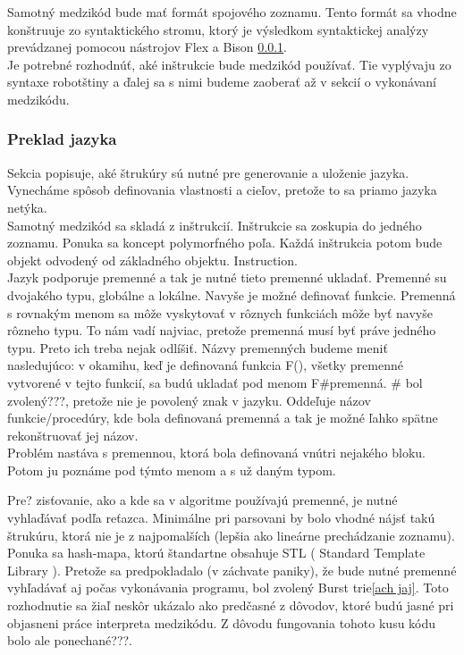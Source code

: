 
Samotný medzikód bude mať formát spojového zoznamu. Tento formát sa vhodne konštruuje zo syntaktického stromu, ktorý je výsledkom syntaktickej analýzy prevádzanej pomocou nástrojov Flex a Bison \ref{}.\\

Je potrebné rozhodnúť, aké inštrukcie bude medzikód používať. Tie vyplývaju zo syntaxe robotštiny a ďalej sa s nimi budeme zaoberať až v sekcií o vykonávaní medzikódu.

\subsubsection{Preklad jazyka}
Sekcia popisuje, aké štrukúry sú nutné pre generovanie a uloženie jazyka. Vynecháme spôsob definovania vlastnosti a cieľov, pretože to sa priamo jazyka netýka.\\

Samotný medzikód sa skladá z inštrukcií. Inštrukcie sa zoskupia do jedného zoznamu. Ponuka sa koncept  polymorfného poľa. %
Každá inštrukcia potom bude objekt odvodený od základného objektu. Instruction.\\ %

Jazyk podporuje premenné a tak je nutné tieto premenné ukladať.
Premenné su dvojakého typu, globálne a lokálne. Navyše je možné definovať funkcie. Premenná s rovnakým menom sa môže vyskytovať v rôznych funkciách  môže byť navyše rôzneho typu. To nám vadí najviac, pretože premenná musí byť práve jedného typu. Preto ich treba nejak odlíšiť. Názvy premenných budeme meniť nasledujúco: v okamihu, keď je definovaná funkcia F(), všetky premenné vytvorené v tejto funkcií, sa budú ukladať pod menom F\#premenná. \# bol zvolený???, pretože nie je povolený znak v jazyku. Oddeľuje názov funkcie/procedúry, kde bola definovaná premenná a tak je možné ľahko spätne rekonštruovať jej názov.\\
Problém nastáva s premennou, ktorá bola definovaná vnútri nejakého bloku. Potom ju poznáme pod týmto menom a s už daným typom. 

Pre? zisťovanie, ako a kde sa v algoritme používajú premenné, je nutné vyhlaďávať podľa reťazca. Minimálne pri parsovani by bolo vhodné nájsť takú štrukúru, ktorá nie je z najpomalších (lepšia ako lineárne prechádzanie zoznamu). Ponuka sa hash-mapa, ktorú štandartne obsahuje STL ( Standard Template Library ). Pretože sa predpokladalo (v záchvate paniky), že bude nutné premenné vyhľadávať aj počas vykonávania programu, bol zvolený Burst trie\ref{ach jaj}. Toto rozhodnutie sa žiaľ neskôr ukázalo ako predčasné z dôvodov, ktoré budú jasné pri objasneni práce interpreta medzikódu. Z dôvodu fungovania tohoto kusu kódu bolo ale ponechané???. \\

